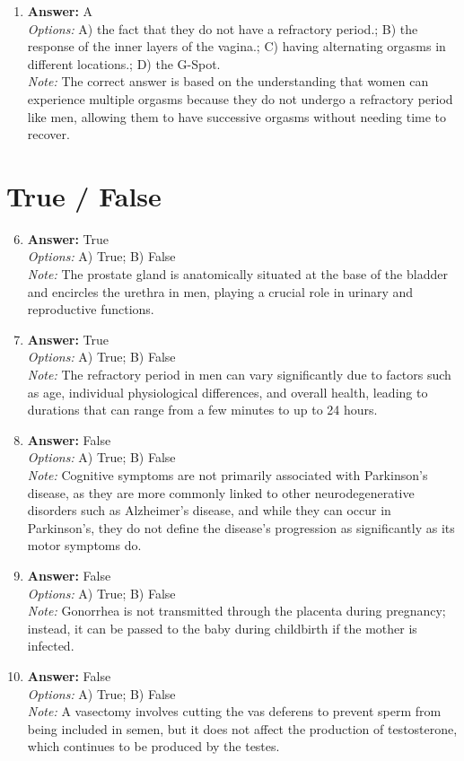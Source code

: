 \documentclass[12pt]{article}
\begin{document}
\begin{enumerate}[label=\arabic*.]
\item \textbf{Answer:} A
\\ \textit{Options:} A) the fact that they do not have a refractory period.; B) the response of the inner layers of the vagina.; C) having alternating orgasms in different locations.; D) the G-Spot.
\\ \textit{Note:} The correct answer is based on the understanding that women can experience multiple orgasms because they do not undergo a refractory period like men, allowing them to have successive orgasms without needing time to recover.
\end{enumerate}

\section*{True / False}
\begin{enumerate}[label=\arabic*.]
\setcounter{enumi}{5}
\item \textbf{Answer:} True
\\ \textit{Options:} A) True; B) False
\\ \textit{Note:} The prostate gland is anatomically situated at the base of the bladder and encircles the urethra in men, playing a crucial role in urinary and reproductive functions.
\item \textbf{Answer:} True
\\ \textit{Options:} A) True; B) False
\\ \textit{Note:} The refractory period in men can vary significantly due to factors such as age, individual physiological differences, and overall health, leading to durations that can range from a few minutes to up to 24 hours.
\item \textbf{Answer:} False
\\ \textit{Options:} A) True; B) False
\\ \textit{Note:} Cognitive symptoms are not primarily associated with Parkinson's disease, as they are more commonly linked to other neurodegenerative disorders such as Alzheimer's disease, and while they can occur in Parkinson's, they do not define the disease's progression as significantly as its motor symptoms do.
\item \textbf{Answer:} False
\\ \textit{Options:} A) True; B) False
\\ \textit{Note:} Gonorrhea is not transmitted through the placenta during pregnancy; instead, it can be passed to the baby during childbirth if the mother is infected.
\item \textbf{Answer:} False
\\ \textit{Options:} A) True; B) False
\\ \textit{Note:} A vasectomy involves cutting the vas deferens to prevent sperm from being included in semen, but it does not affect the production of testosterone, which continues to be produced by the testes.
\end{enumerate}
\end{document}
